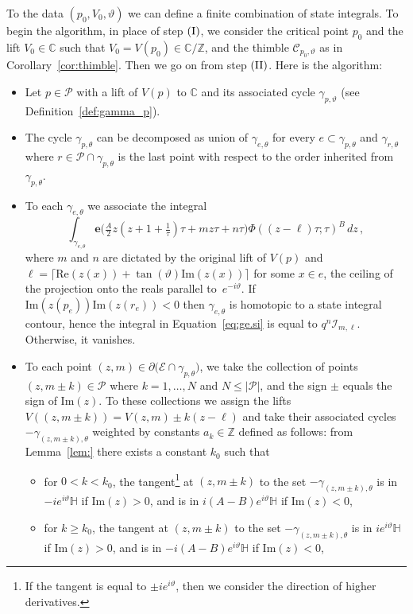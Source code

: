 \documentclass[12pt,reqno]{amsart}
\theoremstyle{definition}
\def\BZ{\mathbb Z}
\def\BC{\mathbb C}
\def\calI{\mathcal I}
\def\calC{\mathcal C}
\def\calE{\mathcal E}
\def\calP{\mathcal P}
\def\Re{\mathrm{Re}}
\def\Im{\mathrm{Im}}
\def\be{\begin{equation}}
\def\ee{\end{equation}}
\def\e{\mathbf e}
\renewcommand{\=}{\;=\;}
\begin{document}
To the data $(p_0,V_0,\vartheta)$ we can define a finite combination of state integrals. To begin the algorithm, in place of step $(\rm I)$, we consider the critical point $p_0$ and the lift $V_0\in\BC$ such that $V_0=V(p_0)\in\BC/\BZ$, and the thimble $\calC_{p_0,\vartheta}$ as in Corollary~\ref{cor:thimble}. Then we go on from step $(\rm II)$. Here is the algorithm:
\begin{itemize}
  \item[$(\rm I)$] Let $p\in\calP$ with a lift of $V(p)$ to $\BC$ and its associated cycle $\gamma_{p,\vartheta}$ (see Definition~\ref{def:gamma_p}).
  \item[$(\rm II)$] The cycle $\gamma_{p,\theta}$ can be decomposed as union of $\gamma_{e,\theta}$ for every $e\subset\gamma_{p,\theta}$ and $\gamma_{r,\theta}$ where $r\in\calP\cap\gamma_{p,\theta}$ is the last point with respect to the order inherited from $\gamma_{p,\theta}$. 
  \item[$(\rm III)$] To each $\gamma_{e,\theta}$ we associate the integral
  \be\label{eq:ge.si}
  \int_{\gamma_{e,\theta}} \e\big(\tfrac{A}{2}z(z+1+\tfrac{1}{\tau})\tau+mz\tau+n\tau\big)\Phi((z-\ell)\tau;\tau)^B\, dz\,,
  \ee 
  where $m$ and $n$ are dictated by the original lift of $V(p)$ and $\ell=\lceil \Re(z(x))+\tan(\vartheta)\Im(z(x))\rceil$ for some $x\in e$, the ceiling of the projection onto the reals parallel to~$e^{-i\vartheta}$. If $\Im(z(p_e))\Im(z(r_e))<0$ then $\gamma_{e,\theta}$ is homotopic to a state integral contour, hence the integral in Equation~\eqref{eq:ge.si} is equal to $q^n\calI_{m,\ell}$. Otherwise, it vanishes. 
  \item[$(\rm IV)$] To each point $(z,m)\in\partial\big(\calE\cap\gamma_{p,\theta}\big)$, we take the collection of points $(z,m\pm k)\in\calP$ where $k=1,\ldots, N$ and $N\leq |\calP|$, and the sign $\pm$ equals the sign of $\Im(z)$.  To these collections we assign the lifts $V((z,m\pm k))=V(z,m)\pm k(z-\ell)$ and take their associated cycles $-\gamma_{(z,m\pm k),\theta}$ weighted by constants $a_{k}\in\BZ$ defined as follows: from Lemma~\ref{lem:} there exists a constant $k_0$ such that 
\begin{itemize}
  \item[$\bullet$]  for $0<k<k_0$,  the tangent\footnote{If the tangent is equal to $\pm i e^{i\vartheta}$, then we consider the direction of higher derivatives.} at $(z,m\pm k)$ to the set $-\gamma_{(z,m\pm k),\theta}$ is in $-i e^{i\vartheta}\mathbb{H}$ if $\Im(z)>0$, and is in $i(A-B) e^{i\vartheta}\mathbb{H}$ if $\Im(z)<0$,
  \item[$\bullet$] for $k\geq k_0$, the tangent at $(z,m\pm k)$ to the set $-\gamma_{(z,m\pm k),\theta}$ is in $i e^{i\vartheta}\mathbb{H}$ if $\Im(z)>0$, and is in $-i(A-B) e^{i\vartheta}\mathbb{H}$ if $\Im(z)<0$,

\end{itemize}
\end{itemize}
\end{document}
